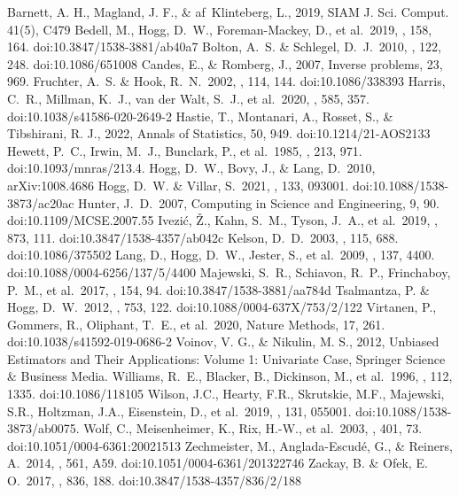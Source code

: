 \documentclass[modern]{aastex631}
\begin{document}
\begin{thebibliography}{dummy}
Barnett, A. H., Magland, J. F., \& af~Klinteberg, L., 2019, SIAM J. Sci. Comput. 41(5), C479
 Bedell, M., Hogg, D.~W., Foreman-Mackey, D., et al.\ 2019, \aj, 158, 164. doi:10.3847/1538-3881/ab40a7
 Bolton, A.~S. \& Schlegel, D.~J.\ 2010, \pasp, 122, 248. doi:10.1086/651008
 Candes, E., \& Romberg, J., 2007, Inverse problems, 23, 969.
 Fruchter, A.~S. \& Hook, R.~N.\ 2002, \pasp, 114, 144. doi:10.1086/338393
 Harris, C.~R., Millman, K.~J., van der Walt, S.~J., et al.\ 2020, \nat, 585, 357. doi:10.1038/s41586-020-2649-2
 Hastie, T., Montanari, A., Rosset, S., \& Tibshirani, R. J., 2022, Annals of Statistics, 50, 949. doi:10.1214/21-AOS2133
 Hewett, P.~C., Irwin, M.~J., Bunclark, P., et al.\ 1985, \mnras, 213, 971. doi:10.1093/mnras/213.4.
 Hogg, D.~W., Bovy, J., \& Lang, D.\ 2010, arXiv:1008.4686
 Hogg, D.~W. \& Villar, S.\ 2021, \pasp, 133, 093001. doi:10.1088/1538-3873/ac20ac
 Hunter, J.~D.\ 2007, Computing in Science and Engineering, 9, 90. doi:10.1109/MCSE.2007.55
 Ivezi{\'c}, {\v{Z}}., Kahn, S.~M., Tyson, J.~A., et al.\ 2019, \apj, 873, 111. doi:10.3847/1538-4357/ab042c
 Kelson, D.~D.\ 2003, \pasp, 115, 688. doi:10.1086/375502
 Lang, D., Hogg, D.~W., Jester, S., et al.\ 2009, \aj, 137, 4400. doi:10.1088/0004-6256/137/5/4400
 Majewski, S.~R., Schiavon, R.~P., Frinchaboy, P.~M., et al.\ 2017, \aj, 154, 94. doi:10.3847/1538-3881/aa784d
 Tsalmantza, P. \& Hogg, D.~W.\ 2012, \apj, 753, 122. doi:10.1088/0004-637X/753/2/122
 Virtanen, P., Gommers, R., Oliphant, T.~E., et al.\ 2020, Nature Methods, 17, 261. doi:10.1038/s41592-019-0686-2
 Voinov, V. G., \& Nikulin, M. S., 2012, Unbiased Estimators and Their Applications: Volume 1: Univariate Case, Springer Science \& Business Media.
 Williams, R.~E., Blacker, B., Dickinson, M., et al.\ 1996, \aj, 112, 1335. doi:10.1086/118105
 Wilson, J.C., Hearty, F.R., Skrutskie, M.F., Majewski, S.R., Holtzman, J.A., Eisenstein, D., et al.\ 2019, \pasp, 131, 055001. doi:10.1088/1538-3873/ab0075.
 Wolf, C., Meisenheimer, K., Rix, H.-W., et al.\ 2003, \aap, 401, 73. doi:10.1051/0004-6361:20021513
 Zechmeister, M., Anglada-Escud{\'e}, G., \& Reiners, A.\ 2014, \aap, 561, A59. doi:10.1051/0004-6361/201322746
 Zackay, B. \& Ofek, E. O.\ 2017, \apj, 836, 188. doi:10.3847/1538-4357/836/2/188


\end{thebibliography}
\end{document}
